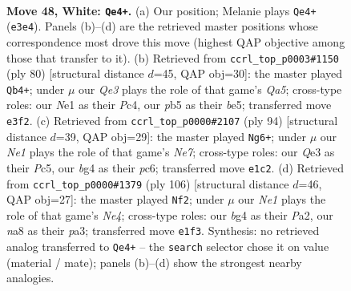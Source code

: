 \documentclass[11pt]{article}
\begin{document}
\clearpage

\begin{figure}[p]\centering
\begin{subfigure}{0.46\textwidth}\centering
\resizebox{\linewidth}{!}{%
\newchessgame
\chessboard[
  setfen={n6r/8/8/1p3k2/6bp/P2PQ3/7K/4Nq2 w - - 10 48},
  showmover=false,
  pgfstyle=straightmove, color=movearrow, markmove={e3-e4}
]}
\caption{}
\end{subfigure}\hfill
\begin{subfigure}{0.46\textwidth}\centering
\resizebox{\linewidth}{!}{%
\newchessgame
\chessboard[
  setfen={1k6/7p/3p4/Q2Pb3/2P5/1q2P3/2N4p/7K w - - 8 41},
  showmover=false,
  pgfstyle=straightmove, color=movearrow, markmove={a5-b4}
]}
\caption{}
\end{subfigure}
\\[4pt]
\begin{subfigure}{0.46\textwidth}\centering
\resizebox{\linewidth}{!}{%
\newchessgame
\chessboard[
  setfen={3q3k/4NQb1/2p4p/2P4P/8/p7/5PK1/8 w - - 1 48},
  showmover=false,
  pgfstyle=straightmove, color=movearrow, markmove={e7-g6}
]}
\caption{}
\end{subfigure}\hfill
\begin{subfigure}{0.46\textwidth}\centering
\resizebox{\linewidth}{!}{%
\newchessgame
\chessboard[
  setfen={8/1kp5/8/1p5p/4N2K/p1P2q2/P1Q5/8 w - - 4 54},
  showmover=false,
  pgfstyle=straightmove, color=movearrow, markmove={e4-f2}
]}
\caption{}
\end{subfigure}
\caption{\textbf{Move 48, White: \texttt{Qe4+}.} (a) Our position; Melanie plays \texttt{Qe4+} (\texttt{e3e4}). Panels (b)--(d) are the retrieved master positions whose correspondence most drove this move (highest QAP objective among those that transfer to it). (b) Retrieved from \texttt{ccrl\_top\_p0003\#1150} (ply 80) [structural distance $d$=45, QAP obj=30]: the master played \texttt{Qb4+}; under $\mu$ our \emph{Qe3} plays the role of that game's \emph{Qa5}; cross-type roles: our \emph{N}e1 as their \emph{P}c4, our \emph{p}b5 as their \emph{b}e5; transferred move \texttt{e3f2}. (c) Retrieved from \texttt{ccrl\_top\_p0000\#2107} (ply 94) [structural distance $d$=39, QAP obj=29]: the master played \texttt{Ng6+}; under $\mu$ our \emph{Ne1} plays the role of that game's \emph{Ne7}; cross-type roles: our \emph{Q}e3 as their \emph{P}c5, our \emph{b}g4 as their \emph{p}c6; transferred move \texttt{e1c2}. (d) Retrieved from \texttt{ccrl\_top\_p0000\#1379} (ply 106) [structural distance $d$=46, QAP obj=27]: the master played \texttt{Nf2}; under $\mu$ our \emph{Ne1} plays the role of that game's \emph{Ne4}; cross-type roles: our \emph{b}g4 as their \emph{P}a2, our \emph{n}a8 as their \emph{p}a3; transferred move \texttt{e1f3}. Synthesis: no retrieved analog transferred to \texttt{Qe4+} -- the \texttt{search} selector chose it on value (material / mate); panels (b)--(d) show the strongest nearby analogies.}
\label{fig:thought-m94}
\end{figure}
\end{document}

